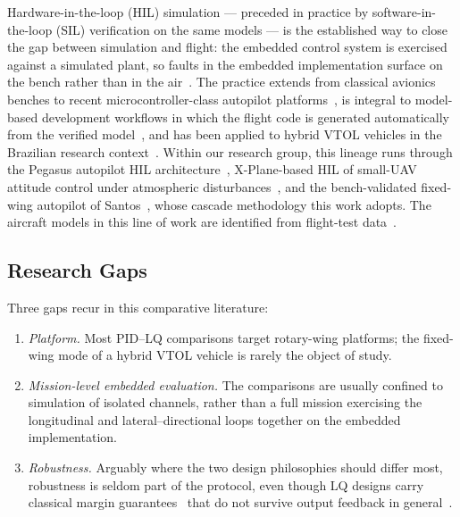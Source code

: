 Hardware-in-the-loop (HIL) simulation --- preceded in practice by
software-in-the-loop (SIL) verification on the same models --- is the
established way to close the gap between simulation and flight: the embedded control system is
exercised against a simulated plant, so faults in the embedded
implementation surface on the bench rather than in the
air~\cite{jung2007hil,cai2009design}. The practice extends from
classical avionics benches to recent microcontroller-class autopilot
platforms~\cite{coopmans2015software,laabousse2025advanced}, is
integral to model-based development workflows in which the flight code
is generated automatically from the verified
model~\cite{erkkinen2006automatic,erkkinen2009model,paw2011integrated},
and has been applied to hybrid VTOL vehicles in the Brazilian research
context~\cite{silva2019control}. Within our research group, this
lineage runs through the Pegasus autopilot HIL
architecture~\cite{bittar2012pegasus}, X-Plane-based HIL of small-UAV
attitude control under atmospheric
disturbances~\cite{bittar2014hil}, and the bench-validated
fixed-wing autopilot of Santos~\cite{santos2018,santos2017hilloops},
whose cascade methodology this work adopts. The aircraft models in
this line of work are identified from flight-test
data~\cite{sato2021,sato2020identificacao,angelo2026}.

\subsection{Research Gaps}
Three gaps recur in this comparative literature:
\begin{enumerate}
  \item \emph{Platform.} Most PID--LQ comparisons target rotary-wing
        platforms; the fixed-wing mode of a hybrid VTOL vehicle is
        rarely the object of study.
  \item \emph{Mission-level embedded evaluation.} The comparisons are
        usually confined to simulation of isolated channels, rather
        than a full mission exercising the longitudinal and
        lateral--directional loops together on the embedded
        implementation.
  \item \emph{Robustness.} Arguably where the two design philosophies
        should differ most, robustness is seldom part of the
        protocol, even though LQ designs carry classical margin
        guarantees~\cite{safonov1977gain} that do not survive output
        feedback in general~\cite{doyle1978guaranteed}.
\end{enumerate}

